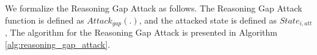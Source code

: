 
We formalize the Reasoning Gap Attack as follows. The Reasoning Gap Attack function is defined as $Attack_{gap}(.)$, and the attacked state is defined as $State_{i,att}$, The algorithm for the Reasoning Gap Attack is presented in Algorithm \ref{alg:reasoning_gap_attack}.




